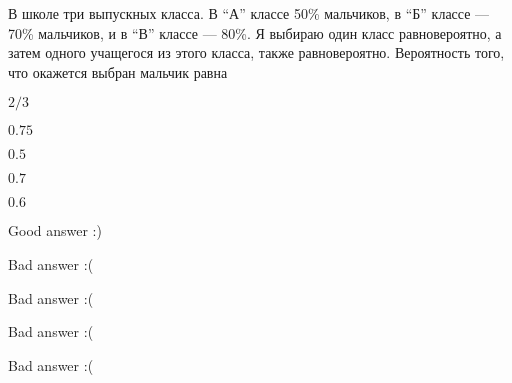
\begin{question}
В школе три выпускных класса. В ``А'' классе 50\% мальчиков, в ``Б''
классе --- 70\% мальчиков, и в ``В'' классе --- 80\%. Я выбираю один
класс равновероятно, а затем одного учащегося из этого класса, также
равновероятно. Вероятность того, что окажется выбран мальчик равна
\begin{answerlist}
  \item \(2/3\)
  \item \(0.75\)
  \item \(0.5\)
  \item \(0.7\)
  \item \(0.6\)
\end{answerlist}
\end{question}

\begin{solution}
\begin{answerlist}
  \item Good answer :)
  \item Bad answer :(
  \item Bad answer :(
  \item Bad answer :(
  \item Bad answer :(
\end{answerlist}
\end{solution}

